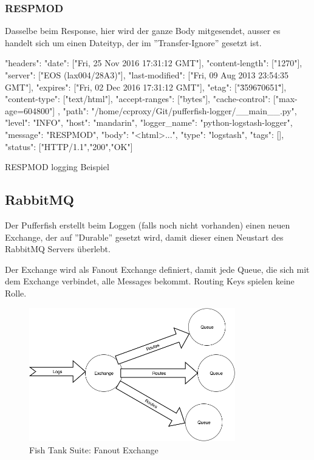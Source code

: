 \subsubsection{RESPMOD}
Dasselbe beim Response, hier wird der ganze Body mitgesendet, ausser es handelt sich um einen Dateityp, der im ''Transfer-Ignore'' gesetzt ist.
\begin{listing}[H]
\begin{jscode}
 {
    "headers": {
      "date": ["Fri, 25 Nov 2016 17:31:12 GMT"],
      "content-length": ["1270"],
      "server": ["EOS (lax004/28A3)"],
      "last-modified": ["Fri, 09 Aug 2013 23:54:35 GMT"],
      "expires": ["Fri, 02 Dec 2016 17:31:12 GMT"],
      "etag": ["\"359670651\""],
      "content-type": ["text/html"],
      "accept-ranges": ["bytes"],
      "cache-control": ["max-age=604800"]
    },
    "path": "/home/ccproxy/Git/pufferfish-logger/__main__.py",
    "level": "INFO",
    "host": "mandarin",
    "logger_name": "python-logstash-logger",
    "message": "RESPMOD",
    "body": "<html>...",
    "type": "logstash",
    "tags": [],
    "status": ["HTTP/1.1","200","OK"]
}    
\end{jscode}
\caption{RESPMOD logging Beispiel}
\label{lst:pufferfish-respmod-logging}
\end{listing}

\subsection{RabbitMQ}
Der Pufferfish erstellt beim Loggen (falls noch nicht vorhanden) einen neuen Exchange, der auf ''Durable'' gesetzt wird, damit dieser einen Neustart des RabbitMQ Servers überlebt.

Der Exchange wird als Fanout Exchange definiert, damit jede Queue, die sich mit dem Exchange verbindet, alle Messages bekommt. Routing Keys spielen keine Rolle.

\begin{figure}[H]
	\centering
	\includegraphics[width=0.8\textwidth]{img/RabbitMQ.png}
	\caption{Fish Tank Suite: Fanout Exchange}
	\label{fig:rabbitmq-fanout-exchange}
\end{figure}

